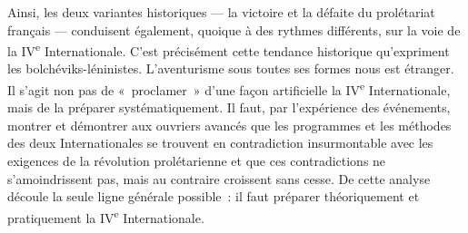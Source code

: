 \documentclass[french,twoside]{book} %
\begin{document}
Ainsi, les deux variantes historiques — la victoire et la défaite du prolétariat français — conduisent également, quoique à des rythmes différents, sur la voie de la IV\textsuperscript{e} Internationale. C’est précisément cette tendance historique qu’expriment les bolchéviks-léninistes. L’aventurisme sous toutes ses formes nous est étranger. Il s’agit non pas de « proclamer » d’une façon artificielle la IV\textsuperscript{e} Internationale, mais de la préparer systématiquement. Il faut, par l’expérience des événements, montrer et démontrer aux ouvriers avancés que les programmes et les méthodes des deux Internationales se trouvent en contradiction insurmontable avec les exigences de la révolution prolétarienne et que ces contradictions ne s’amoindrissent pas, mais au contraire croissent sans cesse. De cette analyse découle la seule ligne générale possible : il faut préparer théoriquement et pratiquement la IV\textsuperscript{e} Internationale.
\end{document}
